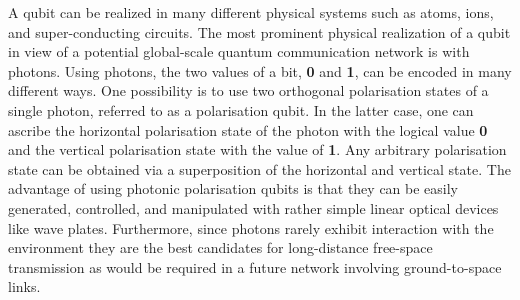 \documentclass{article}
\begin{document}
A qubit can be realized in many different physical systems such as atoms, ions, and super-conducting circuits. The most prominent physical realization of a qubit in view of a potential global-scale quantum communication network is with photons. Using photons, the two values of a bit, \textbf{0} and \textbf{1}, can be encoded in many different ways.
One possibility is to use two orthogonal polarisation states of a single photon, referred to as a polarisation qubit. In the latter case, one can ascribe the horizontal polarisation state of the photon with the logical value \textbf{0} and the vertical polarisation state with the value of \textbf{1}. Any arbitrary polarisation state can be obtained via a superposition of the horizontal and vertical state. The advantage of using photonic polarisation qubits is that they can be easily generated, controlled, and manipulated with rather simple linear optical devices like wave plates. Furthermore, since photons rarely exhibit interaction with the environment they are the best candidates for long-distance free-space transmission as would be required in a future network involving ground-to-space links.
\end{document}
